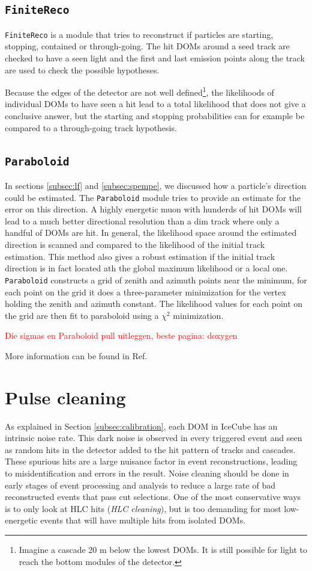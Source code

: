 \subsection{\texttt{FiniteReco}}
\texttt{FiniteReco} is a module that tries to reconstruct if particles are starting, stopping, contained or through-going. The hit DOMs around a seed track are checked to have a seen light and the first and last emission points along the track are used to check the possible hypotheses.

Because the edges of the detector are not well defined\footnote{Imagine a cascade 20 m below the lowest DOMs. It is still possible for light to reach the bottom modules of the detector.}, the likelihoods of individual DOMs to have seen a hit lead to a total likelihood that does not give a conclusive answer, but the starting and stopping probabilities can for example be compared to a through-going track hypothesis.
\subsection{\texttt{Paraboloid}}
In sections \ref{subsec:lf} and \ref{subsec:spempe}, we discussed how a particle's direction could be estimated. The \texttt{Paraboloid} module tries to provide an estimate for the error on this direction. A highly energetic muon with hunderds of hit DOMs will lead to a much better directional resolution than a dim track where only a handful of DOMs are hit. In general, the likelihood space around the estimated direction is scanned and compared to the likelihood of the initial track estimation. This method also gives a robust estimation if the initial track direction is in fact located ath the global maximum likelihood or a local one. \texttt{Paraboloid} constructs a grid of zenith and azimuth points near the minimum, for each point on the grid it does a three-parameter minimization for the vertex holding the zenith and azimuth constant. The likelihood values for each point on the grid are then fit to paraboloid using a $\chi^2$ minimization.

\textcolor{red}{Die sigmas en Paraboloid pull uitleggen, beste pagina: doxygen}

More information can be found in Ref. \cite{Neunhoffer:2004ha}

\section{Pulse cleaning}
\label{sec:pulsecleaning}
As explained in Section \ref{subsec:calibration}, each DOM in IceCube has an intrinsic noise rate. This dark noise is observed in every triggered event and seen as random hits in the detector added to the hit pattern of tracks and cascades. These spurious hits are a large nuisance factor in event reconstructions, leading to misidentification and errors in the result. Noise cleaning should be done in early stages of event processing and analysis to reduce a large rate of bad reconstructed events that pass cut selections. One of the most conservative ways is to only look at HLC hits (\textit{HLC cleaning}), but is too demanding for most low-energetic events that will have multiple hits from isolated DOMs. 

